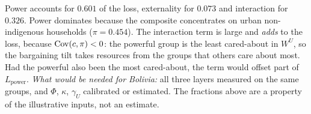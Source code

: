 \documentclass[../solutions_manual.tex]{subfiles}
\begin{document}
 Power accounts for $0.601$ of the loss, externality for $0.073$ and interaction for $0.326$. Power dominates because the composite concentrates on urban non-indigenous households ($\pi = 0.454$). The interaction term is large and \emph{adds} to the loss, because $\operatorname{Cov}(c, \pi) < 0$: the powerful group is the least cared-about in $W^U$, so the bargaining tilt takes resources from the groups that others care about most. Had the powerful also been the most cared-about, the term would offset part of $L_{\text{power}}$. \emph{What would be needed for Bolivia:} all three layers measured on the same groups, and $\Phi$, $\kappa$, $\gamma_U$ calibrated or estimated. The fractions above are a property of the illustrative inputs, not an estimate.
\end{document}
